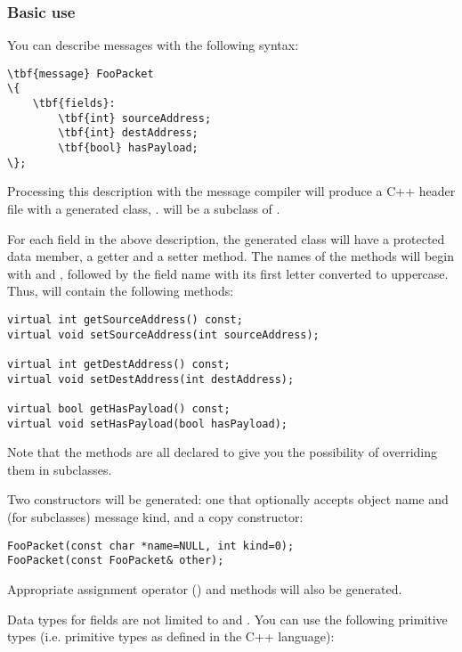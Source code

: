 \subsubsection{Basic use}

You can describe messages with the following syntax:

\begin{Verbatim}[commandchars=\\\{\}]
\tbf{message} FooPacket
\{
    \tbf{fields}:
        \tbf{int} sourceAddress;
        \tbf{int} destAddress;
        \tbf{bool} hasPayload;
\};
\end{Verbatim}

Processing this description with the message compiler will produce
a C++ header file with a generated class, .
 will be a subclass of .

For each field in the above description, the generated class will have
a protected data member, a getter and a setter method. The names of the
methods will begin with  and ,
followed by the field name with its first letter converted to uppercase.
Thus,  will contain the following methods:

\begin{verbatim}
virtual int getSourceAddress() const;
virtual void setSourceAddress(int sourceAddress);

virtual int getDestAddress() const;
virtual void setDestAddress(int destAddress);

virtual bool getHasPayload() const;
virtual void setHasPayload(bool hasPayload);
\end{verbatim}

Note that the methods are all declared  to give you the possibility
of overriding them in subclasses.

Two constructors will be generated: one that optionally accepts object name and
(for  subclasses) message kind, and a copy constructor:

\begin{verbatim}
FooPacket(const char *name=NULL, int kind=0);
FooPacket(const FooPacket& other);
\end{verbatim}

Appropriate assignment operator () and  methods will
also be generated.

Data types for fields are not limited to  and . You can use the
following primitive types (i.e. primitive types as defined in the C++ language):

